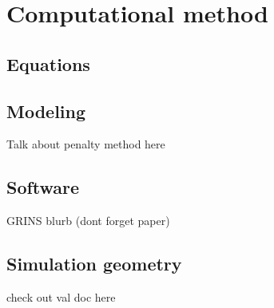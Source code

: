 \section{Computational method}
\label{sec:method}

\subsection{Equations}

\subsection{Modeling}

Talk about penalty method here

\subsection{Software}


GRINS blurb (dont forget paper)


\subsection{Simulation geometry}

check out val doc here